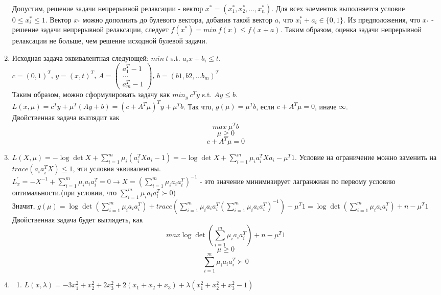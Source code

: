 \documentclass[12pt]{extreport}
\theoremstyle{definiton}
\theoremstyle{definition}
\theoremstyle{definition}
\let\leq\leqslant
\let\geq\geqslant
\begin{document}
\begin{enumerate}
    \\ Допустим, решение задачи непрерывной релаксации - вектор $x^* = (x_1^*, x_2^*, \ldots, x_n^*)$. Для всех элементов выполняется условие $0 \leq x_i^* \leq 1$. Вектор $x_^*$ можно дополнить до булевого вектора, добавив такой вектор $a$, что $x_i^*+a_i \in \{0,1\}$. Из предположения, что $x_^*$ - решение задачи непрерывной релаксации, следует $f(x^*) = min\ f(x) \leq f(x+a)$. Таким образом, оценка задачи непрерывной релаксации не больше, чем решение исходной булевой задачи.
    \item Исходная задача эквивалентная следующей: $min\ t$ s.t. $a_ix+b_i \leq t$.
    \\$c = (0,1)^T$, $y = (x,t)^T$, $A = 
    \begin{pmatrix}
    a_1^T -1\\
    \ldots\\
    a_m^T -1
    \end{pmatrix}$, $b = (b1,b2, \ldots b_m)^T$
    \\ Таким образом, можно сформулировать задачу как $min_y\ c^Ty$ s.t. $Ay \leq b$.
    \\ $L(x, \mu) = c^Ty + \mu^T(Ay + b) = (c+A^T\mu)^Ty + \mu^Tb$. Так что, $g(\mu)= \mu^Tb$, если $c+A^T\mu = 0$, иначе $\infty$.
    \\ Двойственная задача выглядит как $$max\ \mu^Tb$$ $$\mu \geq 0$$ $$c+A^T\mu = 0$$
    \item 
    $L(X, \mu) = -\log \det X +\sum_{i=1}^m \mu_i(a_i^TXa_i-1) = -\log \det X +\sum_{i=1}^m \mu_ia_i^TXa_i - \mu^T1$. Условие на ограничение можно заменить на $trace(a_ia_i^TX) \leq 1$, эти условия эквивалентны.
    \\ $L_x^{'} = -X^{-1} + \sum_{i=1}^m \mu_i a_ia_i^T = 0 \to X = (\sum_{i=1}^m \mu_i a_ia_i^T)^{-1}$ - это значение минимизирует лагранжиан по первому условию оптимальности.(при условии, что $\sum_{i=1}^m \mu_i a_ia_i^T \succ 0$)
    \\ Значит, $g(\mu) = \log \det (\sum_{i=1}^m \mu_i a_ia_i^T) + trace(\sum_{i=1}^m \mu_ia_ia_i^T(\sum_{i=1}^m \mu_i a_ia_i^T)^{-1}) - \mu^T1 = \log \det (\sum_{i=1}^m \mu_i a_ia_i^T)+n - \mu^T1$
    \\ Двойственная задача будет выглядеть, как $$max \log \det (\sum_{i=1}^m \mu_i a_ia_i^T)+n - \mu^T1$$ $$\mu \geq 0$$ $$\sum_{i=1}^m \mu_i a_ia_i^T \succ 0$$
    \item 
    \begin{enumerate}
        \item $L(x,\lambda) = -3x_1^2+x_2^2+2x_3^2+2(x_1+x_2+x_3)+\lambda(x_1^2+x_2^2+x_3^2-1)$

\end{enumerate}
\end{enumerate}
\end{document}
